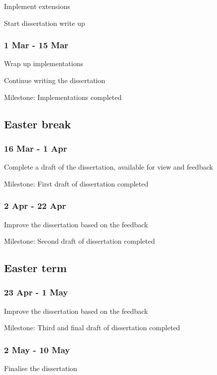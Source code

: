 \documentclass[12pt]{article}
\begin{document}
Implement extensions

Start dissertation write up

\subsubsection*{1 Mar - 15 Mar}

Wrap up implementations

Continue writing the dissertation

Milestone: Implementations completed

\subsection*{Easter break}

\subsubsection*{16 Mar - 1 Apr}

Complete a draft of the dissertation, available for view and feedback

Milestone: First draft of dissertation completed

\subsubsection*{2 Apr - 22 Apr}

Improve the dissertation based on the feedback

Milestone: Second draft of dissertation completed

\subsection*{Easter term}

\subsubsection*{23 Apr - 1 May}

Improve the dissertation based on the feedback

Milestone: Third and final draft of dissertation completed

\subsubsection*{2 May - 10 May}

Finalise the dissertation
\end{document}
